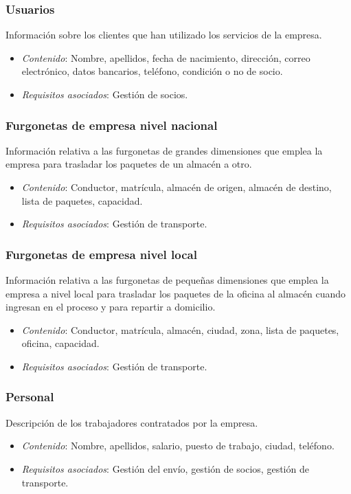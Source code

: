\subsubsection{Usuarios}
	Información sobre los clientes que han utilizado los servicios de la empresa. 
\begin{itemize}
	\item \textit{Contenido}: Nombre, apellidos, fecha de nacimiento, dirección, correo electrónico, datos bancarios, teléfono, condición o no de socio.
	\item \textit{Requisitos asociados}: Gestión de socios. \\
\end{itemize}

\subsubsection{Furgonetas de empresa nivel nacional}
	Información relativa a las furgonetas de grandes dimensiones que emplea la empresa para trasladar los paquetes de un almacén a otro.
\begin{itemize}
	\item \textit{Contenido}: Conductor, matrícula, almacén de origen, almacén de destino, lista de paquetes, capacidad.
	\item \textit{Requisitos asociados}: Gestión de transporte.\\
\end{itemize}

\subsubsection{Furgonetas de empresa nivel local}
	Información relativa a las furgonetas de pequeñas dimensiones que emplea la empresa a nivel local para trasladar los paquetes de la oficina al almacén cuando ingresan en el proceso y para repartir a domicilio. 
\begin{itemize}
	\item \textit{Contenido}: Conductor, matrícula, almacén, ciudad, zona, lista de paquetes, oficina, capacidad.
	\item \textit{Requisitos asociados}: Gestión de transporte. \\
\end{itemize}


\subsubsection{Personal}
	Descripción de los trabajadores contratados por la empresa.
\begin{itemize}
	\item \textit{Contenido}: Nombre, apellidos, salario, puesto de trabajo, ciudad, teléfono.
	
	\item \textit{Requisitos asociados}: Gestión del envío, gestión de socios, gestión de transporte. \\
\end{itemize}


